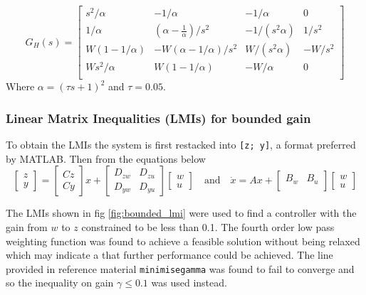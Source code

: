 \documentclass{article}
\begin{document}
\begin{equation}
    G_H(s) = \begin{bmatrix}
        s^2/\alpha & -1/\alpha & -1/\alpha & 0 \\
        1/\alpha & \left(\alpha - \frac{1}{\alpha}\right)/s^2 & - 1/(s^2 \alpha) & 1/s^2 \\
        W\left(1 - 1/\alpha \right) & - W\left( \alpha- 1/\alpha \right)/s^2 & W / (s^2 \alpha) & - W/s^2 \\
        W s^2 / \alpha & W(1 - 1/\alpha) & - W/\alpha & 0 \\
    \end{bmatrix}
\end{equation}
Where $\alpha = (\tau s + 1)^2$ and $\tau = 0.05$.

\subsubsection{Linear Matrix Inequalities (LMIs) for bounded gain}

To obtain the LMIs the system is first restacked into \texttt{[z; y]}, a format preferred by MATLAB.
Then from the equations below
\begin{equation}
    \begin{bmatrix}
        z \\
        y
    \end{bmatrix} = \begin{bmatrix}
        Cz \\
        Cy
    \end{bmatrix} x + \begin{bmatrix}
        D_{zw} & D_{zu} \\
        D_{yw} & D_{yu}
    \end{bmatrix} \begin{bmatrix}
        w \\
        u
    \end{bmatrix} \quad \text{and} \quad \dot{x} = Ax + \begin{bmatrix}
        B_w & B_u \\
    \end{bmatrix} \begin{bmatrix}
        w \\
        u
    \end{bmatrix}
\end{equation}

The LMIs shown in fig \ref{fig:bounded_lmi} were used to find a controller with the gain from $w$ to $z$ constrained to be less than 0.1.
The fourth order low pass weighting function was found to achieve a feasible solution without being relaxed which may indicate a that further performance could be achieved.
The line provided in reference material \cite{lecture} \texttt{minimise{gamma}} was found to fail to converge and so the inequality on gain $\gamma \le 0.1$ was used instead.
\end{document}
